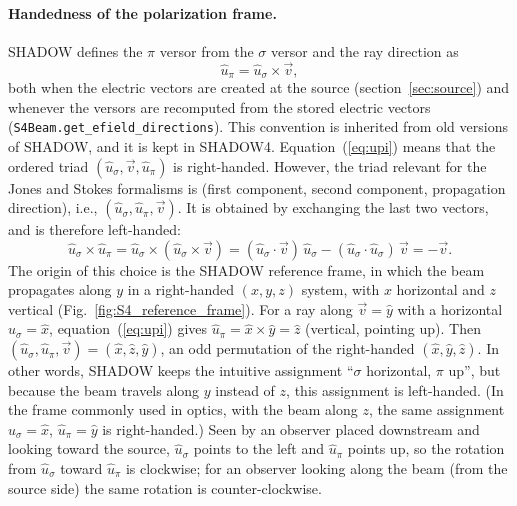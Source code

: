 \documentclass{iucr}
\begin{document}
\paragraph{Handedness of the polarization frame.}
SHADOW defines the $\pi$ versor from the $\sigma$ versor and the ray direction as
\begin{equation}\label{eq:upi}
  \hat{u}_\pi = \hat{u}_\sigma \times \vec{v},
\end{equation}
both when the electric vectors are created at the source (section~\ref{sec:source}) and whenever the versors are recomputed from the stored electric vectors ({\tt S4Beam.get\_efield\_directions}). This convention is inherited from old versions of SHADOW, and it is kept in SHADOW4.
Equation~(\ref{eq:upi}) means that the ordered triad $(\hat{u}_\sigma, \vec{v}, \hat{u}_\pi)$ is right-handed. However, the triad relevant for the Jones and Stokes formalisms is (first component, second component, propagation direction), i.e., $(\hat{u}_\sigma, \hat{u}_\pi, \vec{v})$. It is obtained by exchanging the last two vectors, and is therefore left-handed:
\begin{equation}\label{eq:lefthanded}
  \hat{u}_\sigma \times \hat{u}_\pi
  = \hat{u}_\sigma \times (\hat{u}_\sigma \times \vec{v})
  = (\hat{u}_\sigma\cdot\vec{v})\,\hat{u}_\sigma - (\hat{u}_\sigma\cdot\hat{u}_\sigma)\,\vec{v}
  = -\vec{v}.
\end{equation}
The origin of this choice is the SHADOW reference frame, in which the beam propagates along $y$ in a right-handed $(x,y,z)$ system, with $x$ horizontal and $z$ vertical (Fig.~\ref{fig:S4_reference_frame}). For a ray along $\vec{v}=\hat{y}$ with a horizontal $\hat{u}_\sigma=\hat{x}$, equation~(\ref{eq:upi}) gives $\hat{u}_\pi=\hat{x}\times\hat{y}=\hat{z}$ (vertical, pointing up). Then $(\hat{u}_\sigma,\hat{u}_\pi,\vec{v})=(\hat{x},\hat{z},\hat{y})$, an odd permutation of the right-handed $(\hat{x},\hat{y},\hat{z})$. In other words, SHADOW keeps the intuitive assignment ``$\sigma$ horizontal, $\pi$ up'', but because the beam travels along $y$ instead of $z$, this assignment is left-handed. (In the frame commonly used in optics, with the beam along $z$, the same assignment $\hat{u}_\sigma=\hat{x}$, $\hat{u}_\pi=\hat{y}$ is right-handed.)
Seen by an observer placed downstream and looking toward the source, $\hat{u}_\sigma$ points to the left and $\hat{u}_\pi$ points up, so the rotation from $\hat{u}_\sigma$ toward $\hat{u}_\pi$ is clockwise; for an observer looking along the beam (from the source side) the same rotation is counter-clockwise.
\end{document}
